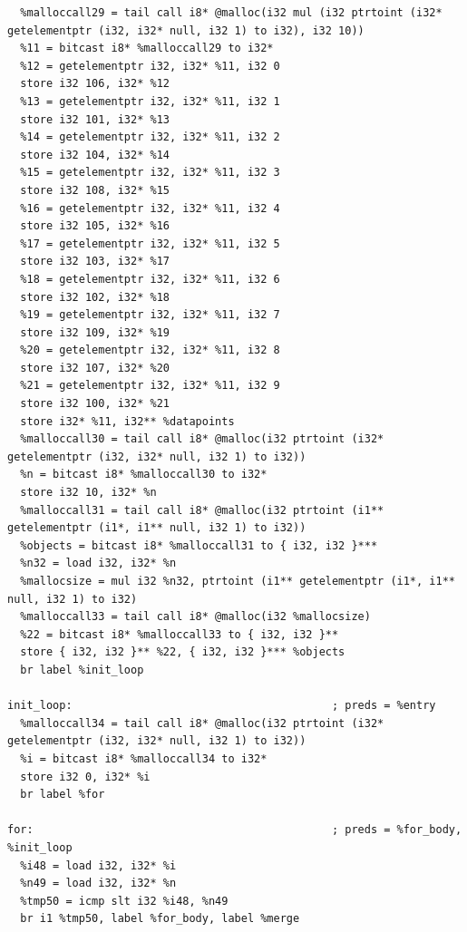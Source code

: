\documentclass[12pt]{article}
\begin{document}
\begin{mdframed}[hidealllines=true,backgroundcolor=green!10]
\begin{lstlisting}
  %malloccall29 = tail call i8* @malloc(i32 mul (i32 ptrtoint (i32* getelementptr (i32, i32* null, i32 1) to i32), i32 10))
  %11 = bitcast i8* %malloccall29 to i32*
  %12 = getelementptr i32, i32* %11, i32 0
  store i32 106, i32* %12
  %13 = getelementptr i32, i32* %11, i32 1
  store i32 101, i32* %13
  %14 = getelementptr i32, i32* %11, i32 2
  store i32 104, i32* %14
  %15 = getelementptr i32, i32* %11, i32 3
  store i32 108, i32* %15
  %16 = getelementptr i32, i32* %11, i32 4
  store i32 105, i32* %16
  %17 = getelementptr i32, i32* %11, i32 5
  store i32 103, i32* %17
  %18 = getelementptr i32, i32* %11, i32 6
  store i32 102, i32* %18
  %19 = getelementptr i32, i32* %11, i32 7
  store i32 109, i32* %19
  %20 = getelementptr i32, i32* %11, i32 8
  store i32 107, i32* %20
  %21 = getelementptr i32, i32* %11, i32 9
  store i32 100, i32* %21
  store i32* %11, i32** %datapoints
  %malloccall30 = tail call i8* @malloc(i32 ptrtoint (i32* getelementptr (i32, i32* null, i32 1) to i32))
  %n = bitcast i8* %malloccall30 to i32*
  store i32 10, i32* %n
  %malloccall31 = tail call i8* @malloc(i32 ptrtoint (i1** getelementptr (i1*, i1** null, i32 1) to i32))
  %objects = bitcast i8* %malloccall31 to { i32, i32 }***
  %n32 = load i32, i32* %n
  %mallocsize = mul i32 %n32, ptrtoint (i1** getelementptr (i1*, i1** null, i32 1) to i32)
  %malloccall33 = tail call i8* @malloc(i32 %mallocsize)
  %22 = bitcast i8* %malloccall33 to { i32, i32 }**
  store { i32, i32 }** %22, { i32, i32 }*** %objects
  br label %init_loop

init_loop:                                        ; preds = %entry
  %malloccall34 = tail call i8* @malloc(i32 ptrtoint (i32* getelementptr (i32, i32* null, i32 1) to i32))
  %i = bitcast i8* %malloccall34 to i32*
  store i32 0, i32* %i
  br label %for

for:                                              ; preds = %for_body, %init_loop
  %i48 = load i32, i32* %i
  %n49 = load i32, i32* %n
  %tmp50 = icmp slt i32 %i48, %n49
  br i1 %tmp50, label %for_body, label %merge


\end{lstlisting}
\end{mdframed}
\end{document}
